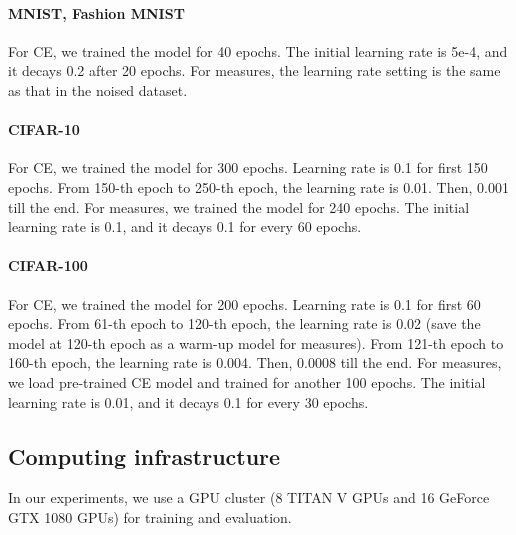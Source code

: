 \documentclass{article}
\begin{document}
\paragraph{MNIST, Fashion MNIST}
For CE, we trained the model for 40 epochs. The initial learning rate is 5e-4, and it decays 0.2 after 20 epochs. For  measures, the learning rate setting is the same as that in the noised dataset.  

\paragraph{CIFAR-10}
For CE, we trained the model for 300 epochs. Learning rate is 0.1 for first 150 epochs. From 150-th epoch to 250-th epoch, the learning rate is 0.01. Then, 0.001 till the end. For  measures, we trained the model for 240 epochs. The initial learning rate is 0.1, and it decays 0.1 for every 60 epochs.  


\paragraph{CIFAR-100}
For CE, we trained the model for 200 epochs. Learning rate is 0.1 for first 60 epochs. From 61-th epoch to 120-th epoch, the learning rate is 0.02 (save the model at 120-th epoch as a warm-up model for  measures). From 121-th epoch to 160-th epoch, the learning rate is 0.004. Then, 0.0008 till the end. For  measures, we load pre-trained CE model and trained for another 100 epochs. The initial learning rate is 0.01, and it decays 0.1 for every 30 epochs.  



\subsection{Computing infrastructure}
In our experiments, we use a GPU cluster (8 TITAN V GPUs and 16 GeForce GTX 1080 GPUs) for training and evaluation.
 
\end{document}
